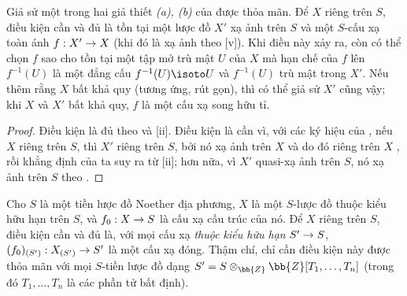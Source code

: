 \documentclass[oneside,10pt]{amsart}
\makeatletter
\newcommand{\ega@arrow}[2]{\mathchoice{#1}{#2}{#2}{#2}}
\renewcommand{\to}{\ega@arrow{\longrightarrow}{\rightarrow}}
\let\EGAOriginalLabel\label
\renewcommand{\label}[1]{\phantomsection\EGAOriginalLabel{#1}}
\makeatother
\begin{document}
\begin{corollary}[5.6.2]
\label{II.5.6.2}
Giả sử một trong hai giả thiết \emph{(a), (b)} của  được thỏa mãn.
Để $X$ riêng trên $S$, điều kiện cần và đủ là tồn tại một lược đồ $X'$ xạ ảnh trên $S$ và một $S$-cấu xạ toàn ánh $f:X'\to X$ (khi đó là xạ ảnh theo [v]).
Khi điều này xảy ra, còn có thể chọn $f$ sao cho tồn tại một tập mở trù mật $U$ của $X$ mà hạn chế của $f$ lên $f^{-1}(U)$ là một đẳng cấu $f^{-1}(U)\isoto U$ và $f^{-1}(U)$ trù mật trong $X'$.
Nếu thêm rằng $X$ bất khả quy (tương ứng, rút gọn), thì có thể giả sử $X'$ cũng vậy; khi $X$ và $X'$ bất khả quy, $f$ là một cấu xạ song hữu tỉ.
\end{corollary}

\begin{proof}
Điều kiện là đủ theo  và [ii].
Điều kiện là cần vì, với các ký hiệu của , nếu $X$ riêng trên $S$, thì $X'$ riêng trên $S$, bởi nó xạ ảnh trên $X$ và do đó riêng trên $X$ , rồi khẳng định của ta suy ra từ [ii]; hơn nữa, vì $X'$ quasi-xạ ảnh trên $S$, nó xạ ảnh trên $S$ theo .
\end{proof}

\begin{corollary}[5.6.3]
\label{II.5.6.3}
Cho $S$ là một tiền lược đồ Noether địa phương, $X$ là một $S$-lược đồ thuộc kiểu hữu hạn trên $S$, và $f_0:X\to S$ là cấu xạ cấu trúc của nó.
Để $X$ riêng trên $S$, điều kiện cần và đủ là, với mọi cấu xạ \emph{thuộc kiểu hữu hạn} $S'\to S$, $(f_0)_{(S')}:X_{(S')}\to S'$ là một cấu xạ đóng.
Thậm chí, chỉ cần điều kiện này được thỏa mãn với mọi $S$-tiền lược đồ dạng $S'=S\otimes_\bb{Z}\bb{Z}[T_1,\ldots,T_n]$ (trong đó $T_1,\ldots,T_n$ là các phần tử bất định).
\end{corollary}
\end{document}
